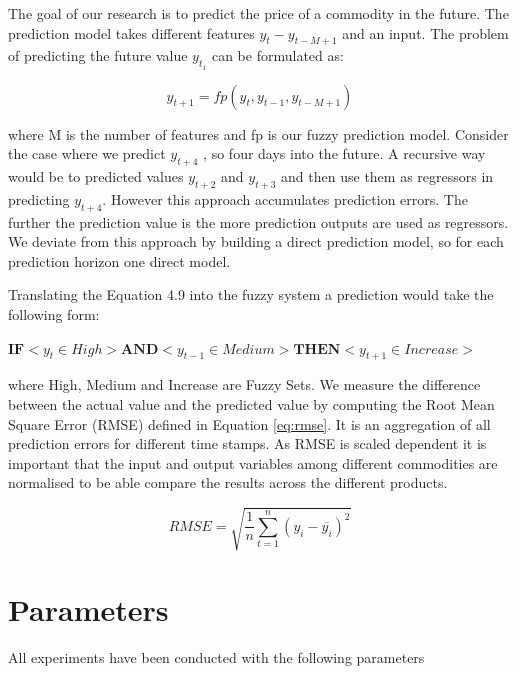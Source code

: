 The goal of our research is to predict the price of a commodity in the future. The prediction model takes different features $y_t - y_{t-M+1}$ and an input. The problem of predicting the future value $y_{t_1}$ can be formulated as: 


\begin{equation} \label{eq:solve}
y_{t + 1} = fp(y_{t}, y_{t-1}, y_{t-M+1})
 \end{equation}

where M is the number of features and fp is our fuzzy prediction model. Consider the case where we predict $y_{t +4}$ , so four days into the future. A recursive way would be to predicted values $y_{t+2}$ and $y_{t+3}$ and then use them as regressors in predicting $y_{t +4}$. However this approach accumulates prediction errors. The further the prediction value is the more prediction outputs are used as regressors. We deviate from this approach by building a direct prediction model, so for each prediction horizon one direct model. 

Translating the Equation 4.9 into the fuzzy system a prediction would take the following form: \\

\centerline {$ \textbf{IF} <  y_t  \in High> \textbf{AND} < y_{t-1} \in Medium > \textbf{THEN} <  y_{t+1} \in Increase > $} 


where High, Medium and Increase are Fuzzy Sets. We measure the difference between the actual value and the predicted value by computing the Root Mean Square Error (RMSE) defined in Equation \ref{eq:rmse}. It is an aggregation of all prediction errors for different time stamps. As RMSE is scaled dependent it is important that the input and output variables among different commodities are normalised to be able compare the results across the different products. 


\begin{equation} \label{eq:rmse}
RMSE = \sqrt{\frac{1}{n}\sum_{t=1}^{n} (y_i -  \overline{y_i})^2}
 \end{equation}





\section{Parameters}

All experiments have been conducted with the following parameters



